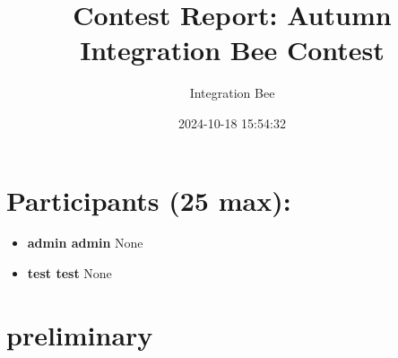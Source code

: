 \documentclass{article}
\providecommand{\tightlist}{%
  \setlength{\itemsep}{0pt}\setlength{\parskip}{0pt}}
\begin{document}
\title{Contest Report: \textbf{ Autumn Integration Bee Contest }}
\author{Integration Bee}
\date{ 2024-10-18 15:54:32 }
\maketitle

\section{Participants (25 max):}\label{participants-25-max}

\begin{itemize}
\tightlist
\item
  \textbf{admin admin} None
\item
  \textbf{test test} None
\end{itemize}

\section{preliminary}\label{preliminary}
\end{document}
